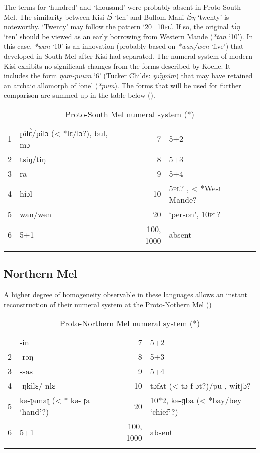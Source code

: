 The terms for ‘hundred’ and ‘thousand’ were probably absent in Proto-South-Mel. The similarity between Kisi \textit{t{\'{ɔ}}} ‘ten’ and Bullom-Mani \textit{t{\`{ɔ}}ŋ} ‘twenty’ is noteworthy. ‘Twenty’ may follow the pattern ‘20=10\textsc{pl}’. If so, the original \textit{t{\`{ɔ}}ŋ} ‘ten’ should be viewed as an early borrowing from Western Mande (\textit{*tan} ‘10’). In this case, \textit{*wan} ‘10’ is an innovation (probably based on \textit{*wan/wen} ‘five’) that developed in South Mel after Kisi had separated.  The numeral system of modern Kisi exhibits no significant changes from the forms described by Koelle. It includes the form \textit{ŋam-puum} ‘6’ (Tucker Childs: \textit{ŋ{\v{ɔ}}ŋpúm}) that may have retained an archaic allomorph of ‘one’ (\textit{*pum}). The forms that will be used for further comparison are summed up in the table below ().

\begin{table}
\caption{\label{tab:3:217}Proto-South Mel numeral system (*)}


\begin{tabularx}{\textwidth}{lQrl}
\lsptoprule

1 & pìl{\`{ɛ}}/pilɔ (< *lɛ/lɔ?), bul, mɔ & 7 & 5+2\\
2 & tsiŋ/tiŋ & 8 & 5+3\\
3 & ra & 9 & 5+4\\
4 & hiɔl & 10 & 5\textsc{pl}? , < *West Mande? \\
5 & wan/wen & 20 & ‘person’, 10\textsc{pl}? \\
6 & 5+1 &  {100,} 1000 & absent\\
\lspbottomrule
\end{tabularx}
\end{table}
  
 \largerpage
\subsection{Northern Mel}%

A higher degree of homogeneity observable in these languages allows an instant reconstruction of their numeral system at the Proto-Nothern Mel ()
\begin{table}
\caption{\label{tab:3:218}Proto-Northern Mel numeral system (*)}
\begin{tabularx}{\textwidth}{lQrl}
 & -in & 7 & 5+2\\
2 & -rəŋ & 8 & 5+3\\
3 & -sas & 9 & 5+4\\
4 & -ŋkɨlɛ/-nlɛ & 10 & tɔfʌt (< tɔ-f-ɔt?)/pu , wɨtʃɔ? \\
5 & kə-ʈamaʈ (< * kə- ʈa ‘hand’?) & 20 & 10*2, kə-ɡba (< *bay/bey ‘chief’?)\\
6 & 5+1 & 100, 1000 & absent\\
\lspbottomrule
\end{tabularx}
\end{table}


